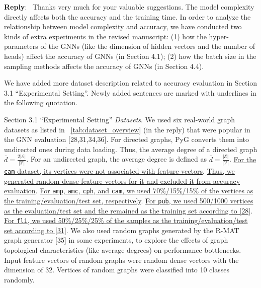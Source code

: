 \documentclass[12pt]{article}
\newenvironment{myquote}[1]%
{\vspace{0.5em}\begin{zitat}{#1}}
{\end{zitat}\vspace{0.5em}}
\newenvironment{reply}
   {\medskip \noindent \textbf{Reply}:\  }
   {\medskip}
\begin{document}
\begin{reply}
    Thanks very much for your valuable suggestions.
    The model complexity directly affects both the accuracy and the training time.
    In order to analyze the relationship between model complexity and accuracy, we have conducted two kinds of extra experiments in the revised manuscript: (1) how the hyper-parameters of the GNNs (like the dimension of hidden vectors and the number of heads) affect the accuracy of GNNs (in Section 4.1); (2) how the batch size in the sampling methods affects the accuracy of GNNs (in Section 4.4).
    
    We have added more dataset description related to accuracy evaluation in Section 3.1 ``Experimental Setting''.
    Newly added sentences are marked with underlines in the following quotation.
    
    \begin{myquote}{Section 3.1 ``Experimental Setting''}
    \emph{Datasets}.
    We used six real-world graph datasets as listed in \tablename~\ref{tab:dataset_overview} (in the reply) that were popular in the GNN evaluation [28,31,34,36].
    For directed graphs, PyG converts them into undirected ones during data loading.
    Thus, the average degree of a directed graph $\bar{d}=\frac{2|\mathcal{E}|}{|\mathcal{V}|}$.
    For an undirected graph, the average degree is defined as $\bar{d}=\frac{|\mathcal{E}|}{|\mathcal{V}|}$.
    \ul{For the \texttt{cam} dataset, its vertices were not associated with feature vectors}.
    \ul{Thus, we generated random dense feature vectors for it and excluded it from accuracy evaluation}.
    \ul{For \texttt{amp}, \texttt{amc}, \texttt{cph}, and \texttt{cam}, we used 70\%/15\%/15\% of the vertices as the training/evaluation/test set, respectively}.
    \ul{For \texttt{pub}, we used 500/1000 vertices as the evaluation/test set and the remained as the training set according to [28]}.
    \ul{For \texttt{fli}, we used 50\%/25\%/25\% of the samples as the training/evaluation/test set according to [31]}.
    We also used random graphs generated by the R-MAT graph generator [35] in some experiments, to explore the effects of graph topological characteristics (like average degrees) on performance bottlenecks.
    Input feature vectors of random graphs were random dense vectors with the dimension of 32.
    Vertices of random graphs were classified into 10 classes randomly.
    

\end{myquote}
\end{reply}
\end{document}
